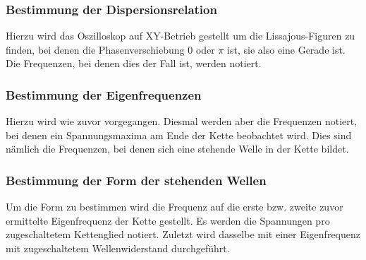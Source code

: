\subsubsection{Bestimmung der Dispersionsrelation}
Hierzu wird das Oszilloskop auf XY-Betrieb gestellt um die Lissajous-Figuren zu finden, bei denen die Phasenverschiebung $0$ oder $\pi$ ist, sie also eine Gerade ist.
Die Frequenzen, bei denen dies der Fall ist, werden notiert.

\subsubsection{Bestimmung der Eigenfrequenzen}
Hierzu wird wie zuvor vorgegangen.
Diesmal werden aber die Frequenzen notiert, bei denen ein Spannungsmaxima am Ende der Kette beobachtet wird.
Dies sind nämlich die Frequenzen, bei denen sich eine stehende Welle in der Kette bildet.

\subsubsection{Bestimmung der Form der stehenden Wellen}
Um die Form zu bestimmen wird die Frequenz auf die erste bzw. zweite zuvor ermittelte Eigenfrequenz der Kette gestellt.
Es werden die Spannungen pro zugeschaltetem Kettenglied notiert.
Zuletzt wird dasselbe mit einer Eigenfrequenz mit zugeschaltetem Wellenwiderstand durchgeführt.
